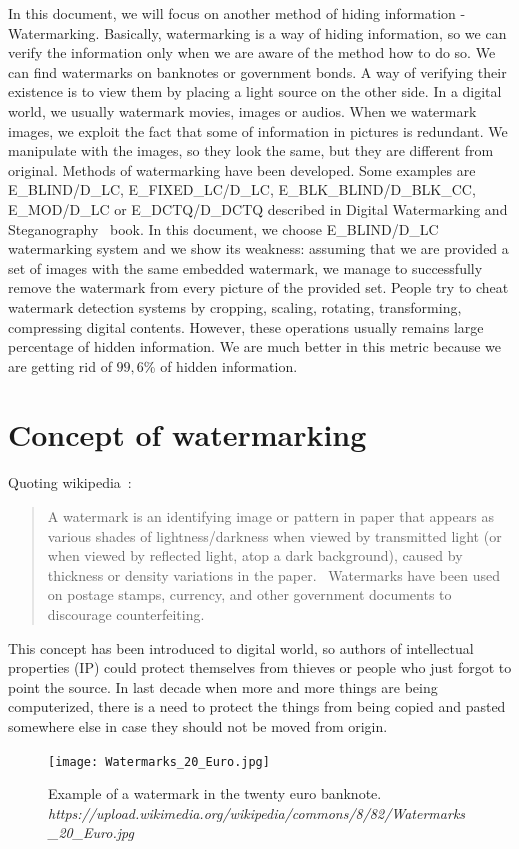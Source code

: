 \documentclass[a4paper,12pt]{article}
\begin{document}
In this document, we will focus on another method of hiding information -
Watermarking. Basically, watermarking is a way of hiding information, so we can
verify the information only when we are aware of the method how to do so. We can
find watermarks on banknotes or government bonds. A way of verifying their existence
is to view them by placing a light source on the other side. In a digital world, we
usually watermark movies, images or audios. When we watermark images, we exploit the fact
that some of information in pictures is redundant. We manipulate with
the images, so they look the same, but they are different from original. Methods of
watermarking have been developed. Some examples are
E\_BLIND/D\_LC, E\_FIXED\_LC/D\_LC, E\_BLK\_BLIND/D\_BLK\_CC, E\_MOD/D\_LC or
E\_DCTQ/D\_DCTQ described in Digital Watermarking and Steganography~\cite{dwas}
book. In this document, we choose E\_BLIND/D\_LC watermarking system and we
show its weakness: assuming that we are provided a set of images with the same embedded
watermark, we manage to successfully remove the watermark from every picture of
the provided set. People try to cheat
watermark detection systems by cropping, scaling, rotating, transforming,
compressing digital contents. However, these operations usually remains large
percentage of hidden information. We are much better in this metric because we
are getting rid of $99,6$\% of hidden information.

\newpage

\section{Concept of watermarking}

Quoting wikipedia~\cite{wiki:water}:
\blockquote{A watermark is an identifying image or pattern in paper that appears
as various shades of lightness/darkness when viewed by transmitted light (or
when viewed by reflected light, atop a dark background), caused by thickness or
density variations in the paper.~\cite{hopap} Watermarks have been used on
postage stamps, currency, and other government documents to discourage
counterfeiting.}
This concept has been introduced to digital world, so authors of intellectual
properties (IP) could protect themselves from thieves or people who just forgot to
point the source. In last decade when more and more things are being
computerized, there is a need to protect the things from being copied and pasted
somewhere else in case they should not be moved from origin.
\begin{figure}[ht]
  \centering
    \texttt{[image: Watermarks\_20\_Euro.jpg]}
  \caption{Example of a watermark in the twenty euro banknote. \footnotesize \textit{https://upload.wikimedia.org/wikipedia/commons/8/82/Watermarks\_20\_Euro.jpg}}
\end{figure}
\end{document}
